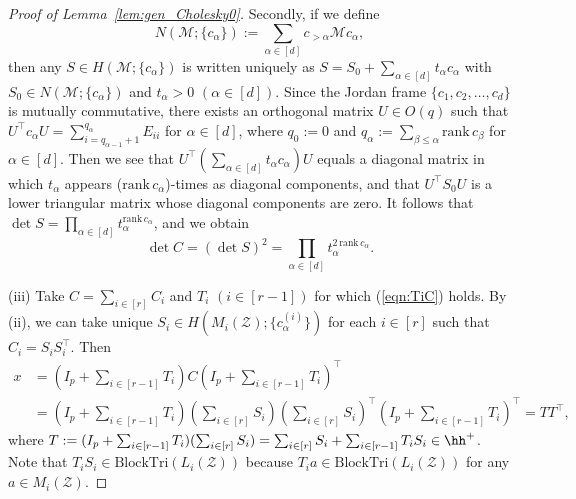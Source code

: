 \documentclass[12pt]{amsart}
\theoremstyle{plain}
\theoremstyle{definition}
\theoremstyle{remark}
\newcommand{\1}{\mathbf{1}}
\newcommand{\mytransp}[1]{ #1^{\top}}
\newcommand{\tri}{\mathrm{BlockTri}}
\begin{document}
\begin{proof}[Proof of Lemma~\ref{lem:gen_Cholesky0}]
 

Secondly,  
 if we define
 $$
  N(\mathcal{M}; \{ c_\alpha \}) := \sum_{\alpha \in [d]} c_{>\alpha}\mathcal{M} c_\alpha,
 $$
 then any $S \in H(\mathcal{M}; \{ c_\alpha \})$ is written uniquely as
  $S = S_0 + \sum_{\alpha \in [d]} t_\alpha c_\alpha$
  with $S_0 \in N(\mathcal{M}; \{ c_\alpha \})$
  and $t_\alpha >0\,\,(\alpha \in [d])$.
Since the Jordan frame $\{c_1, c_2, \dots, c_d\}$ is mutually commutative,
  there exists an orthogonal matrix $U \in O(q)$ such that
  $\mytransp{U} c_\alpha U = \sum_{i = q_{\alpha-1} + 1}^{q_\alpha} E_{ii}$ for $\alpha \in [d]$,
  where $q_0 := 0$ and $q_\alpha := \sum_{\beta \le \alpha} \mathrm{rank}\, c_\beta$ for $\alpha \in [d]$.
Then 
 we see that
 $\mytransp{U} (\sum_{\alpha \in [d]} t_\alpha c_\alpha) U$ equals a diagonal matrix
 in which $t_\alpha$ appears ($\mathrm{rank}\, c_\alpha$)-times as diagonal components,
 and that
 $\mytransp{U} S_0 U$ is a lower triangular matrix whose diagonal components are zero.
It follows that 
 $\det S =  \prod_{\alpha \in [d]} t_\alpha^{\mathrm{rank}\, c_\alpha}$, 
 and we obtain
 $$
 \det C = (\det S)^2 = \prod_{\alpha \in [d]}
  t_\alpha^{2\, \mathrm{rank}\, c_\alpha}. 
 $$


\noindent
(iii)
Take $C = \sum_{i \in [r]} C_i$ and $T_i\,\,(i \in [r-1])$ for which (\ref{eqn:TiC}) holds.
By (ii), 
 we can take unique $S_i \in H(M_i(\mathcal{Z}); \{c^{(i)}_\alpha\})$
 for each $i \in [r]$
 such that $C_i = S_i \mytransp{S_i}$. 
Then 
\begin{align*}
x &= (I_p+ \sum_{i\in[r-1]} T_i) C  \mytransp{(I_p + \sum_{i\in[r-1]} T_i)}\\
  & = (I_p+ \sum_{i\in[r-1]} T_i) (\sum_{i\in[r]} S_i) \mytransp{(\sum_{i\in[r]} S_i)} \mytransp{(I_p + \sum_{i\in[r-1]} T_i)}
  = T \mytransp{T},
\end{align*}
where 
$T :=  (I_p+ \sum_{i\in[r-1]} T_i) (\sum_{i\in[r]} S_i) 
= \sum_{i\in[r]} S_i + \sum_{i\in[r-1]} T_i S_i \in \hh^+$.
Note that $T_i S_i \in \tri(L_i(\mathcal{Z}))$
 because $T_i a \in \tri(L_i(\mathcal{Z}))$ for any $a \in M_i(\mathcal{Z})$. 
 

\end{proof}
\end{document}
